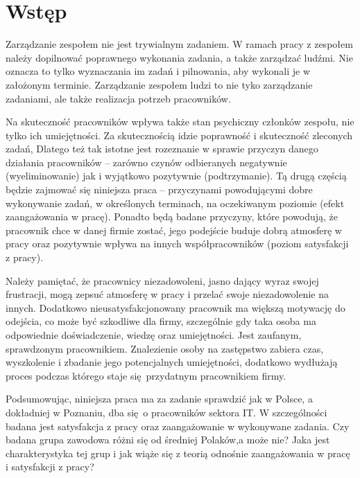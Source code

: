 \section{Wstęp}
Zarządzanie zespołem nie jest trywialnym zadaniem. W ramach pracy z zespołem należy dopilnować poprawnego wykonania zadania, a także zarządzać ludźmi. Nie oznacza to tylko wyznaczania im zadań i pilnowania, aby wykonali je w założonym terminie. Zarządzanie zespołem ludzi to nie tyko zarządzanie zadaniami, ale także realizacja potrzeb pracowników.

Na skuteczność pracowników wpływa także stan psychiczny członków zespołu, nie tylko ich umiejętności. Za skutecznością idzie poprawność i skuteczność zleconych zadań, Dlatego też tak istotne jest rozeznanie w sprawie przyczyn danego działania pracowników -- zarówno czynów odbieranych negatywnie (wyeliminowanie) jak i wyjątkowo pozytywnie (podtrzymanie). Tą drugą częścią będzie zajmować się niniejsza praca -- przyczynami powodującymi dobre wykonywanie zadań, w określonych terminach, na
oczekiwanym poziomie (efekt zaangażowania w pracę). Ponadto będą badane przyczyny, które powodują, że pracownik chce w danej firmie zostać, jego podejście buduje dobrą atmosferę w pracy oraz pozytywnie wpływa na innych współpracowników (poziom satysfakcji z pracy). 

Należy pamiętać, że pracownicy niezadowoleni, jasno dający wyraz swojej frustracji, mogą zepsuć atmosferę w pracy i przelać swoje niezadowolenie na innych. Dodatkowo nieusatysfakcjonowany pracownik ma większą motywację do odejścia, co może być szkodliwe dla firmy, szczególnie gdy taka osoba ma odpowiednie doświadczenie, wiedzę oraz umiejętności. Jest zaufanym, sprawdzonym pracownikiem. Znalezienie osoby na zastępstwo zabiera czas, wyszkolenie i zbadanie jego
potencjalnych umiejętności, dodatkowo wydłużają proces podczas którego staje się przydatnym pracownikiem firmy.

Podsumowując, niniejsza praca ma za zadanie sprawdzić jak w Polsce, a dokładniej w Poznaniu, dba się o pracowników sektora IT. W szczególności badana jest satysfakcja z pracy oraz zaangażowanie w wykonywane zadania. Czy badana grupa zawodowa różni się od średniej Polaków,a może nie? Jaka jest charakterystyka tej grup i jak wiąże się z teorią odnośnie zaangażowania w pracę i satysfakcji z pracy?
